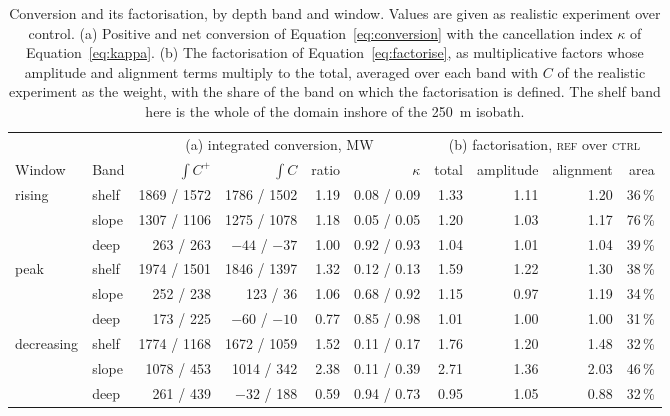 \documentclass[a4paper,fleqn]{cas-sc}
\newcommand{\REF}{\textsc{ref}}
\newcommand{\CTRL}{\textsc{ctrl}}
\begin{document}
\begin{table}[t]
\centering
\caption{Conversion and its factorisation, by depth band and window. Values are given as realistic experiment over control. (a) Positive and net conversion of Equation~\ref{eq:conversion} with the cancellation index $\kappa$ of Equation~\ref{eq:kappa}. (b) The factorisation of Equation~\ref{eq:factorise}, as multiplicative factors whose amplitude and alignment terms multiply to the total, averaged over each band with $C$ of the realistic experiment as the weight, with the share of the band on which the factorisation is defined. The shelf band here is the whole of the domain inshore of the 250~m isobath.}
\label{tab:conversion}
\footnotesize
\begin{tabular}{@{}llrrrr@{\hskip 2.2em}rrrr@{}}
\toprule
& & \multicolumn{4}{c}{(a) integrated conversion, MW}
  & \multicolumn{4}{c}{(b) factorisation, \REF{} over \CTRL{}} \\
\cmidrule(lr){3-6}\cmidrule(l){7-10}
Window & Band & $\int C^{+}$ & $\int C$ & ratio & $\kappa$
       & total & amplitude & alignment & area \\
\midrule
rising     & shelf & 1869 / 1572 & 1786 / 1502 & 1.19 & 0.08 / 0.09
           & 1.33 & 1.11 & 1.20 & 36\,\% \\
           & slope & 1307 / 1106 & 1275 / 1078 & 1.18 & 0.05 / 0.05
           & 1.20 & 1.03 & 1.17 & 76\,\% \\
           & deep  &  263 /  263 & $-44$ / $-37$ & 1.00 & 0.92 / 0.93
           & 1.04 & 1.01 & 1.04 & 39\,\% \\
\addlinespace[0.25em]
peak       & shelf & 1974 / 1501 & 1846 / 1397 & 1.32 & 0.12 / 0.13
           & 1.59 & 1.22 & 1.30 & 38\,\% \\
           & slope &  252 /  238 &  123 /   36 & 1.06 & 0.68 / 0.92
           & 1.15 & 0.97 & 1.19 & 34\,\% \\
           & deep  &  173 /  225 & $-60$ / $-10$ & 0.77 & 0.85 / 0.98
           & 1.01 & 1.00 & 1.00 & 31\,\% \\
\addlinespace[0.25em]
decreasing & shelf & 1774 / 1168 & 1672 / 1059 & 1.52 & 0.11 / 0.17
           & 1.76 & 1.20 & 1.48 & 32\,\% \\
           & slope & 1078 /  453 & 1014 /  342 & 2.38 & 0.11 / 0.39
           & 2.71 & 1.36 & 2.03 & 46\,\% \\
           & deep  &  261 /  439 & $-32$ /  188 & 0.59 & 0.94 / 0.73
           & 0.95 & 1.05 & 0.88 & 32\,\% \\
\bottomrule
\end{tabular}
\end{table}
\end{document}
